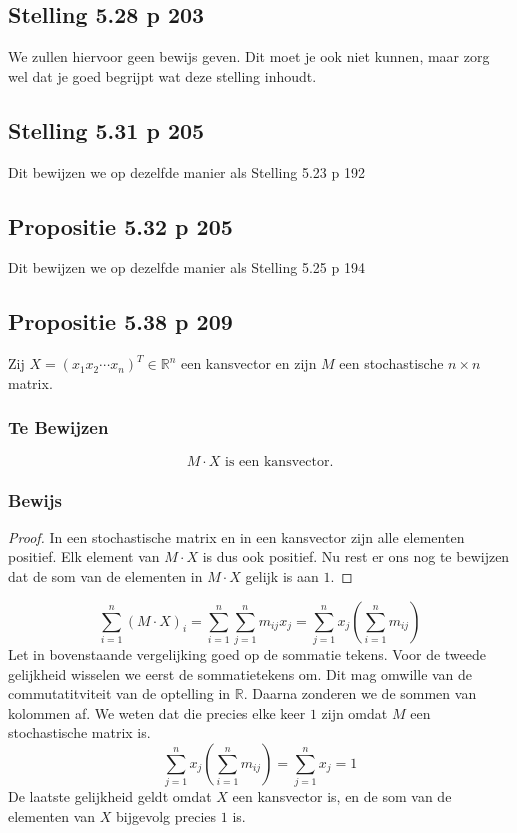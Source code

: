 \documentclass[lineaire_algebra_oplossingen.tex]{subfiles}
\begin{document}
\subsection{Stelling 5.28 p 203}
\label{5.28}
We zullen hiervoor geen bewijs geven. Dit moet je ook niet kunnen, maar zorg wel dat je goed begrijpt wat deze stelling inhoudt.

\subsection{Stelling 5.31 p 205}
\label{5.31}
Dit bewijzen we op dezelfde manier als Stelling 5.23 p 192

\subsection{Propositie 5.32 p 205}
\label{5.32}
Dit bewijzen we op dezelfde manier als Stelling 5.25 p 194

\subsection{Propositie 5.38 p 209}
\label{5.38}
Zij $X = (x_1 x_2 \cdots x_n)^T \in \mathbb{R}^n$ een kansvector en zijn $M$ een stochastische $n\times n$ matrix.

\subsubsection*{Te Bewijzen}
\[
M\cdot X \text{ is een kansvector.}
\]

\subsubsection*{Bewijs}
\begin{proof}
In een stochastische matrix en in een kansvector zijn alle elementen positief. Elk element van $M\cdot X$ is dus ook positief. Nu rest er ons nog te bewijzen dat de som van de elementen in $M \cdot X$ gelijk is aan $1$.
\end{proof}
\[
\sum_{i=1}^n(M\cdot X)_i = \sum_{i=1}^n\sum_{j=1}^nm_{ij}x_j= \sum_{j=1}^nx_j(\sum_{i=1}^nm_{ij})
\]
Let in bovenstaande vergelijking goed op de sommatie tekens. Voor de tweede gelijkheid wisselen we eerst de sommatietekens om. Dit mag omwille van de commutatitviteit van de optelling in $\mathbb{R}$. Daarna zonderen we de sommen van kolommen af. We weten dat die precies elke keer $1$ zijn omdat $M$ een stochastische matrix is.
\[
\sum_{j=1}^nx_j(\sum_{i=1}^nm_{ij}) = \sum_{j=1}^nx_j = 1
\]
De laatste gelijkheid geldt omdat $X$ een kansvector is, en de som van de elementen van $X$ bijgevolg precies $1$ is.
\end{document}
